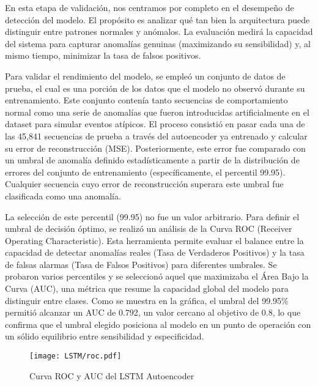 

En esta etapa de validación, nos centramos por completo en el desempeño de detección del modelo. El propósito es analizar qué tan bien la arquitectura puede distinguir entre patrones normales y anómalos. La evaluación medirá la capacidad del sistema para capturar anomalías genuinas (maximizando su sensibilidad) y, al mismo tiempo, minimizar la tasa de falsos positivos.


Para validar el rendimiento del modelo, se empleó un conjunto de datos de prueba, el cual es una porción de los datos que el modelo no observó durante su entrenamiento. Este conjunto contenía tanto secuencias de comportamiento normal como una serie de anomalías que fueron introducidas artificialmente en el dataset para simular eventos atípicos.
El proceso consistió en pasar cada una de las 45,841 secuencias de prueba a través del autoencoder ya entrenado y calcular su error de reconstrucción (MSE). Posteriormente, este error fue comparado con un umbral de anomalía definido estadísticamente a partir de la distribución de errores del conjunto de entrenamiento (específicamente, el percentil 99.95). Cualquier secuencia cuyo error de reconstrucción superara este umbral fue clasificada como una anomalía.

La selección de este percentil (99.95) no fue un valor arbitrario. Para definir el umbral de decisión óptimo, se realizó un análisis de la Curva ROC (Receiver Operating Characteristic). Esta herramienta permite evaluar el balance entre la capacidad de detectar anomalías reales (Tasa de Verdaderos Positivos) y la tasa de falsas alarmas (Tasa de Falsos Positivos) para diferentes umbrales. Se probaron varios percentiles y se seleccionó aquel que maximizaba el Área Bajo la Curva (AUC), una métrica que resume la capacidad global del modelo para distinguir entre clases. Como se muestra en la gráfica, el umbral del 99.95\% permitió alcanzar un AUC de 0.792, un valor cercano al objetivo de 0.8, lo que confirma que el umbral elegido posiciona al modelo en un punto de operación con un sólido equilibrio entre sensibilidad y especificidad.

\begin{figure}[ht!]
      \centering
      \texttt{[image: LSTM/roc.pdf]}
      \caption{Curva ROC y AUC del LSTM Autoencoder}
      \label{fig:roc_lstm}
\end{figure}


